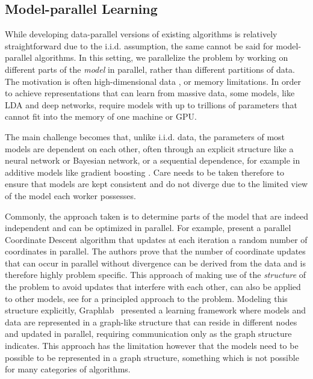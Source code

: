 \subsection*{Model-parallel Learning}

While developing data-parallel versions of existing algorithms is relatively straightforward
due to the i.i.d. assumption, the same cannot be said for model-parallel algorithms. In this
setting, we parallelize the problem by working on different parts of the \emph{model}
in parallel, rather than different partitions of data. The motivation is often
high-dimensional data \cite{parallel-cd-l1}, or
memory limitations. In order to achieve representations
that can learn from massive data, some models, like LDA and deep networks, require
models with up to trillions of parameters \cite{lightLDA, large-scale-dl}
that cannot fit into the memory of one machine or GPU.

The main challenge becomes
that, unlike i.i.d. data, the parameters of most models are dependent on each
other, often through an explicit structure like a neural network or Bayesian network, or a
sequential dependence, for example in additive models like gradient boosting \cite{esl}.
Care needs to be taken therefore to ensure that models are kept consistent and do not
diverge due to the limited view of the model each worker possesses.

Commonly, the approach taken is to determine parts of the model that are indeed
independent and can be optimized in parallel. For example, \citet{parallel-cd-l1}
present a parallel Coordinate Descent algorithm that updates at each iteration
a random number of coordinates in parallel. The authors prove that the number of coordinate updates
that can occur in parallel without divergence can be derived from the data and is therefore
highly problem specific. This approach of making use of the \emph{structure} of
the problem to avoid updates that interfere with each other, can also be applied
to other models, see \citet{model-parallel-learning} for a principled approach
to the problem.
Modeling this structure explicitly, Graphlab~\cite{graphlab, graphlab-distributed} presented a learning framework
where models and data are represented in a graph-like structure that can reside in different
nodes and updated in parallel, requiring communication only as the graph structure
indicates. This approach has the limitation however that the models need to be
possible to be represented in a graph structure, something which is not possible
for many categories of algorithms.

